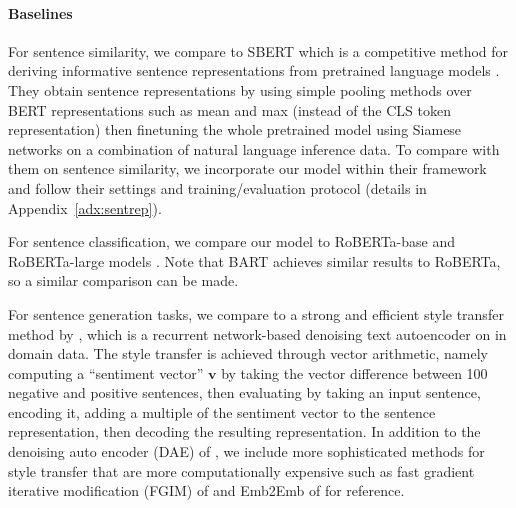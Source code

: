 \paragraph{Baselines}
For sentence similarity, we compare to SBERT which is a competitive method for deriving informative sentence representations from pretrained language models \cite{Reimers2019SentenceBERT}.
They obtain sentence representations by using simple pooling methods over BERT representations such as mean and max (instead of the CLS token representation) then finetuning the whole pretrained model using Siamese networks on a combination of natural language inference data.  To compare with them on sentence similarity, we incorporate our model within their framework and follow their settings and training/evaluation protocol (details in Appendix~\ref{adx:sentrep}). 

For sentence classification, we compare our model to RoBERTa-base and RoBERTa-large models \cite{liu2019RoBERTa}. Note that BART \cite{lewis2019bart} achieves similar results to RoBERTa, so a similar comparison can be made.  %

For sentence generation tasks, we compare to a strong and efficient style transfer method by \citet{shen2019educating}, which is a recurrent network-based denoising text autoencoder on in domain data. The style transfer is achieved  through vector arithmetic, namely computing a “sentiment vector” $\mathbf{v}$ by taking the vector difference between 100 negative and positive sentences, then evaluating by taking an input sentence, encoding it, adding a multiple of the sentiment vector to the sentence representation, then decoding the resulting representation. In addition to the denoising auto encoder (DAE) of \citet{shen2019educating}, we include more sophisticated methods for style transfer that are more computationally expensive such as fast gradient iterative modification (FGIM) of \citet{wang2019controllable} and Emb2Emb of \citet{mai2020plug} for reference.
 

